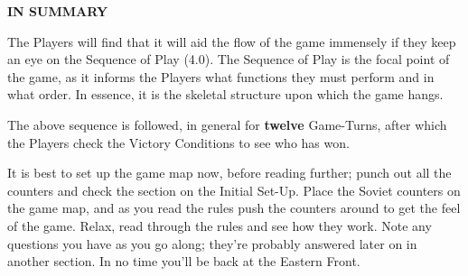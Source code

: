 \textbf{IN SUMMARY}

The Players will find that it will aid the flow of the game immensely if they keep an eye on the Sequence of Play (4.0). The Sequence of Play is the focal point of the game, as it informs the Players what functions they must perform and in what order. In essence, it is the skeletal structure upon which the game hangs.

The above sequence is followed, in general for \textbf{twelve} Game-Turns, after which the Players check the Victory Conditions to see who has won.

It is best to set up the game map now, before reading further; punch out all the counters and check the section on the Initial Set-Up. Place the Soviet counters on the game map, and as you read the rules push the counters around to get the feel of the game. Relax, read through the rules and see how they work. Note any questions you have as you go along; they're probably answered later on in another section. In no time you'll be back at the Eastern Front.
